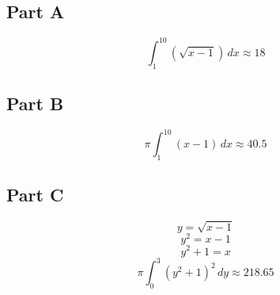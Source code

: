 \subsection{Part A}
\[ \int_{1}^{10} (\sqrt{x - 1})\, dx \approx 18 \]

\subsection{Part B}
\[ \pi\!\!\int_{1}^{10} (x - 1)\, dx \approx 40.5 \]

\subsection{Part C}
\[ y = \sqrt{x - 1} \]
\[ y^2 = x - 1 \]
\[ y^2 + 1 = x \]
\[ \pi\!\!\int_{0}^{3} (y^2 + 1)^2\,dy \approx 218.65 \]
